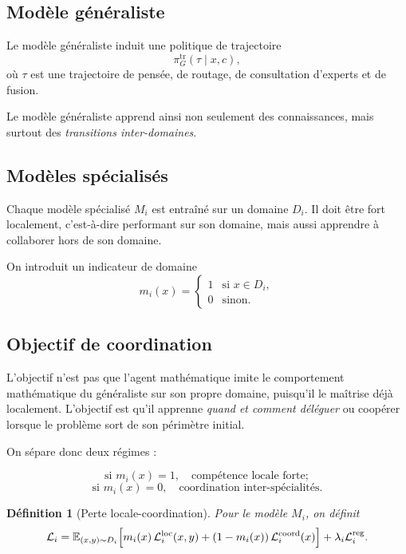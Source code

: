 \documentclass[11pt,a4paper]{article}
\newtheorem{definition}{Définition}[section]
\newcommand{\1}{\mathbf 1}
\begin{document}
\subsection{Modèle généraliste}

Le modèle généraliste induit une politique de trajectoire
\[
\pi_G^{\mathrm{tr}}(\tau \mid x,c),
\]
où \(\tau\) est une trajectoire de pensée, de routage, de consultation d'experts et de fusion.

Le modèle généraliste apprend ainsi non seulement des connaissances, mais surtout des \emph{transitions inter-domaines}.

\subsection{Modèles spécialisés}

Chaque modèle spécialisé \(M_i\) est entraîné sur un domaine \(D_i\). Il doit être fort localement, c'est-à-dire performant sur son domaine, mais aussi apprendre à collaborer hors de son domaine.

On introduit un indicateur de domaine
\[
m_i(x)=
\begin{cases}
1 & \text{si } x\in D_i,\\
0 & \text{sinon.}
\end{cases}
\]

\subsection{Objectif de coordination}

L'objectif n'est pas que l'agent mathématique imite le comportement mathématique du généraliste sur son propre domaine, puisqu'il le maîtrise déjà localement. L'objectif est qu'il apprenne \emph{quand et comment déléguer} ou coopérer lorsque le problème sort de son périmètre initial.

On sépare donc deux régimes :

\[
\text{si } m_i(x)=1,\quad \text{compétence locale forte};
\]
\[
\text{si } m_i(x)=0,\quad \text{coordination inter-spécialités}.
\]

\begin{definition}[Perte locale-coordination]
Pour le modèle \(M_i\), on définit
\[
\mathcal L_i
=
\mathbb E_{(x,y)\sim D_i}
\Bigl[
m_i(x)\,\mathcal L_i^{\mathrm{loc}}(x,y)
+
(1-m_i(x))\,\mathcal L_i^{\mathrm{coord}}(x)
\Bigr]
+
\lambda_i \mathcal L_i^{\mathrm{reg}}.
\]
\end{definition}
\end{document}
